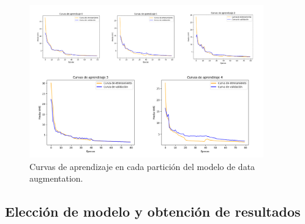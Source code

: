             \begin{figure}[!h]
                \centering
                \includegraphics[width=0.9\textwidth]{img/curvas_daugmentation.png}
                \caption{Curvas de aprendizaje en cada partición del modelo de data augmentation.}
                \label{fig:curvas_daugmentation}
            \end{figure}
    \subsection{Elección de modelo y obtención de resultados}
\endinput



